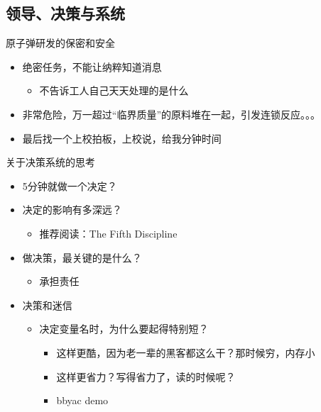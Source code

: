 \documentclass[presentation,dvipdfmx,CJKbookmarks]{beamer}
\begin{document}
\begin{CJK*}{UTF8}{simsun}
\section{领导、决策与系统}
\label{sec:orgbf05a1e}

\begin{frame}[label={sec:orgfa80e14}]{原子弹研发的保密和安全}
\begin{itemize}
\item 绝密任务，不能让纳粹知道消息
\begin{itemize}
\item 不告诉工人自己天天处理的是什么
\end{itemize}
\item 非常危险，万一超过“临界质量”的原料堆在一起，引发连锁反应。。。
\item 最后找一个上校拍板，上校说，给我\thinspace 分钟时间
\end{itemize}
\end{frame}

\begin{frame}[label={sec:orgf5d3b0b}]{关于决策系统的思考}
\begin{itemize}
\item 5\thinspace 分钟就做一个决定？
\item 决定的影响有多深远？
\begin{itemize}
\item 推荐阅读：The Fifth Discipline
\end{itemize}
\item 做决策，最关键的是什么？
\pause
\begin{itemize}
\item 承担责任
\end{itemize}
\item 决策和迷信
\begin{itemize}
\item 决定变量名时，为什么要起得特别短？
\begin{itemize}
\item 这样更酷，因为老一辈的黑客都这么干？那时候穷，内存小
\item 这样更省力？写得省力了，读的时候呢？
\item bbyac demo
\end{itemize}
\end{itemize}
\end{itemize}
\end{frame}


\end{CJK*}
\end{document}
